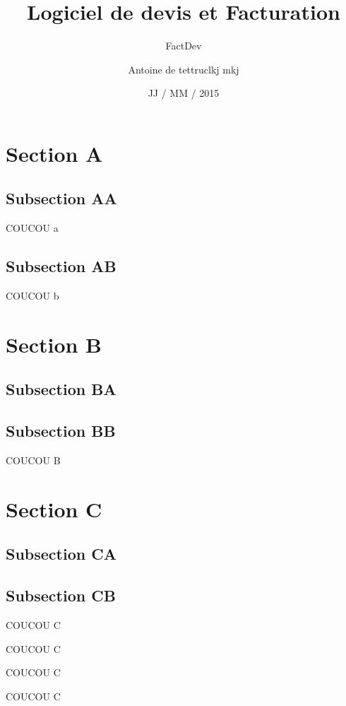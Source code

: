 \documentclass{beamer}
\title[] %
{Logiciel de devis et Facturation}
\subtitle {FactDev}
\author[Antoine de \bsc{Roquemaurel}\newline \bsc{Razanajatovo}] %
{Antoine de \bsc{Roquemaurel}\newline tet\newline truc\newline lkj \newline mkj}
\institute[] %
{
  Universit\'e Toulouse III -- Paul Sabatier \\
  M1 Informatique -- Développement Logiciel 
  \vspace{-10px}
}
\date[ ~ ~ ~ JJ / MM / 2015] %
{JJ / MM / 2015}
\begin{document}
		\begin{frame}
			\titlepage
		\end{frame}
		\section{Section A}
		\subsection{Subsection AA}
		\begin{frame}{COUCOU a}
			~
		\end{frame}
		\subsection{Subsection AB}
		\begin{frame}{COUCOU b}
			~
		\end{frame}
		\section{Section B}
		\subsection{Subsection BA}
		\subsection{Subsection BB}
		\begin{frame}{COUCOU B}
			~
		\end{frame}
		\section{Section C}
		\subsection{Subsection CA}
		\subsection{Subsection CB}
		\begin{frame}{COUCOU C}
			~
		\end{frame}
		\begin{frame}{COUCOU C}
			~
		\end{frame}
		\begin{frame}{COUCOU C}
			~
		\end{frame}
		\begin{frame}{COUCOU C}
			~
		\end{frame}
		
\end{document}
